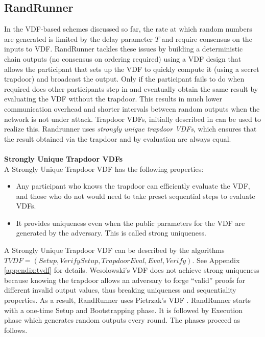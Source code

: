 \documentclass[letterpaper,twocolumn,10pt]{article}
\theoremstyle{definition}
\theoremstyle{remark}
\begin{document}
\subsection{RandRunner}
In the VDF-based schemes discussed so far, the rate at which random numbers are generated is limited by the delay parameter $T$ and require consensus on the inputs to VDF. RandRunner \cite{schindler2021randrunner} tackles these issues by building a deterministic chain outputs (no consensus on ordering required) using a VDF design that allows the participant that sets up the VDF to quickly compute it (using a secret trapdoor) and broadcast the output. Only if the participant fails to do when required does other participants step in and eventually obtain the same result by evaluating the VDF without the trapdoor. This results in much lower communication overhead and shorter intervals between random outputs when the network is not under attack. Trapdoor VDFs, initially described in \cite{wesolowski2019efficient} can be used to realize this. Randrunner uses \emph{strongly unique trapdoor VDFs}, which ensures that the result obtained via the trapdoor and by evaluation are always equal.\\\\
\textbf{Strongly Unique Trapdoor VDFs}\\
A Strongly Unique Trapdoor VDF has the following properties:
\begin{itemize}
    \item Any participant who knows the trapdoor can efficiently evaluate the VDF, and those who do not would need to take preset sequential steps to evaluate VDFs.
    \item It provides uniqueness even when the public parameters for the VDF are generated by the adversary. This is called strong uniqueness. 
\end{itemize}
A Strongly Unique Trapdoor VDF can be described by the algorithms $TVDF = (Setup,VerifySetup, TrapdoorEval, Eval, Verify)$. See Appendix \ref{appendix:tvdf} for details. Wesolowski’s VDF \cite{wesolowski2019efficient} does not achieve strong uniqueness because knowing the trapdoor allows an adversary to forge ``valid'' proofs for different invalid output values, thus breaking uniqueness and sequentiality properties. As a result, RandRunner uses Pietrzak's VDF \cite{pietrzak2018simple}. RandRunner starts with a one-time Setup and Bootstrapping phase. It is followed by Execution phase which generates random outputs every round. The phases proceed as follows.
\end{document}
